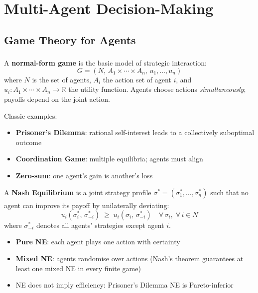 \section{Multi-Agent Decision-Making}

\subsection{Game Theory for Agents}
\begin{tcbitemize}[ skin=sectionraster ]

    \tcbitem[title=Normal-Form Games, raster multicolumn=3]
    A \textbf{normal-form game} is the basic model of strategic interaction:
    \textsuperscript{\cite[][Ch.~3]{shohamMultiagentSystemsAlgorithmic2009}}
    \[
        G = (N,\, A_1 \times \cdots \times A_n,\, u_1, \ldots, u_n)
    \]
    where $N$ is the set of agents, $A_i$ the action set of agent $i$, and
    $u_i: A_1 \times \cdots \times A_n \to \mathbb{R}$ the utility function.
    Agents choose actions \emph{simultaneously}; payoffs depend on the joint action.

    Classic examples:
    \begin{itemize}
        \item \textbf{Prisoner's Dilemma}: rational self-interest leads to a
              collectively suboptimal outcome
        \item \textbf{Coordination Game}: multiple equilibria; agents must align
        \item \textbf{Zero-sum}: one agent's gain is another's loss
    \end{itemize}

    \tcbitem[title=Nash Equilibrium, raster multicolumn=3]
    A \textbf{Nash Equilibrium} is a joint strategy profile $\sigma^* =
    (\sigma_1^*, \ldots, \sigma_n^*)$ such that no agent can improve its payoff
    by unilaterally deviating:\textsuperscript{\cite[][p.~67]{shohamMultiagentSystemsAlgorithmic2009}}
    \begin{equation}
        u_i(\sigma_i^*,\, \sigma_{-i}^*) \;\geq\; u_i(\sigma_i,\, \sigma_{-i}^*)
        \quad \forall\, \sigma_i,\; \forall\, i \in N
    \end{equation}
    where $\sigma_{-i}^*$ denotes all agents' strategies except agent $i$.
    \begin{itemize}
        \item \textbf{Pure NE}: each agent plays one action with certainty
        \item \textbf{Mixed NE}: agents randomise over actions (Nash's theorem guarantees
              at least one mixed NE in every finite game)
        \item NE does not imply efficiency: Prisoner's Dilemma NE is Pareto-inferior
    \end{itemize}


\end{tcbitemize}
